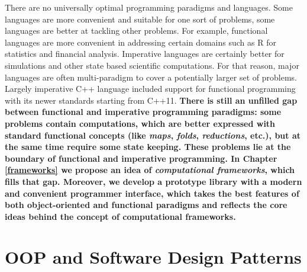 \quad There are no universally optimal programming paradigms and languages. Some languages are more convenient and suitable for one sort of problems, some languages are better at tackling other problems. For example, functional languages are more convenient in addressing certain domains such as R for statistics and financial analysis. Imperative languages are certainly better for simulations and other state based scientific computations. For that reason, major languages are often multi-paradigm to cover a potentially larger set of problems. Largely imperative C++ language included support for functional programming with its newer standards starting from C++11.\newline\null
\quad \textbf{There is still an unfilled gap between functional and imperative programming paradigms: some problems contain computations, which are better expressed with standard functional concepts (like \textit{maps}, \textit{folds}, \textit{reductions}, etc.), but at the same time require some state keeping. These problems lie at the boundary of functional and imperative programming. In Chapter \ref{frameworks} we propose an idea of \textit{computational frameworks}, which fills that gap. Moreover, we develop a prototype library \cite{frameworks-repo} with a modern and convenient programmer interface, which takes the best features of both object-oriented and functional paradigms and reflects the core ideas behind the concept of computational frameworks.}
\section{OOP and Software Design Patterns}
\label{background_oop_design}
